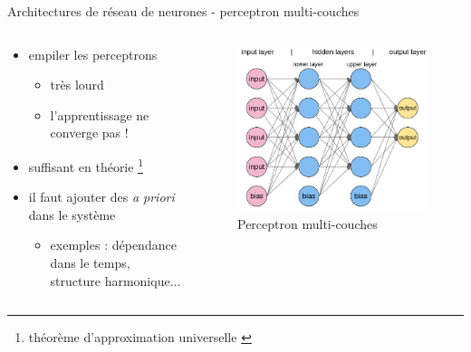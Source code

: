 \documentclass[9pt, aspectratio=169]{beamer}
\begin{document}
\begin{frame}{Architectures de réseau de neurones - perceptron multi-couches} %
\begin{columns}
    \begin{column}{0.48\textwidth}

\begin{itemize}
	\item empiler les perceptrons
	\begin{itemize}
		\item très lourd
		\item l'apprentissage ne converge pas ! 
\end{itemize}
	\item suffisant en théorie \footnote{théorème d'approximation universelle \cite{cybenko_approximation_1989}}
	\item il faut ajouter des \emph{a priori} dans le système
	\begin{itemize}
		\item exemples : dépendance dans le temps, structure harmonique...
	\end{itemize}
\end{itemize}

    \end{column}
    \begin{column}{0.48\textwidth}
    \begin{figure}
		\includegraphics[width=.6\textwidth]{fig/mlp.png}
		\caption{Perceptron multi-couches}
	\end{figure}
	
    \end{column}
\end{columns}

\end{frame}
\end{document}
